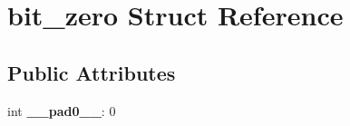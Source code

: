 \hypertarget{structbit__zero}{}\section{bit\+\_\+zero Struct Reference}
\label{structbit__zero}
\subsection*{Public Attributes}
\begin{DoxyCompactItemize}
\item 
\mbox{\label{structbit__zero_a11f9d2094862ee875bdeb0cc4d0fc365}} 
int {\bfseries \+\_\+\+\_\+pad0\+\_\+\+\_\+}\+: 0
\end{DoxyCompactItemize}


